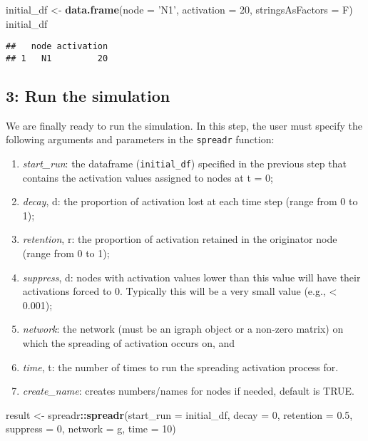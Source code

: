 \documentclass[]{article}
\newenvironment{Shaded}{\begin{snugshade}}{\end{snugshade}}
\newcommand{\KeywordTok}[1]{\textcolor[rgb]{0.13,0.29,0.53}{\textbf{#1}}}
\newcommand{\DataTypeTok}[1]{\textcolor[rgb]{0.13,0.29,0.53}{#1}}
\newcommand{\DecValTok}[1]{\textcolor[rgb]{0.00,0.00,0.81}{#1}}
\newcommand{\FloatTok}[1]{\textcolor[rgb]{0.00,0.00,0.81}{#1}}
\newcommand{\StringTok}[1]{\textcolor[rgb]{0.31,0.60,0.02}{#1}}
\newcommand{\OperatorTok}[1]{\textcolor[rgb]{0.81,0.36,0.00}{\textbf{#1}}}
\newcommand{\NormalTok}[1]{#1}
\providecommand{\tightlist}{%
  \setlength{\itemsep}{0pt}\setlength{\parskip}{0pt}}
\begin{document}
\begin{Shaded}
\begin{Highlighting}[]
\NormalTok{initial_df <-}\StringTok{ }\KeywordTok{data.frame}\NormalTok{(}\DataTypeTok{node =} \StringTok{'N1'}\NormalTok{, }\DataTypeTok{activation =} \DecValTok{20}\NormalTok{, }\DataTypeTok{stringsAsFactors =}\NormalTok{ F)}
\NormalTok{initial_df}
\end{Highlighting}
\end{Shaded}

\begin{verbatim}
##   node activation
## 1   N1         20
\end{verbatim}

\subsection{3: Run the simulation}\label{run-the-simulation}

We are finally ready to run the simulation. In this step, the user must
specify the following arguments and parameters in the \texttt{spreadr}
function:

\begin{enumerate}
\def\labelenumi{(\roman{enumi})}
\tightlist
\item
  \emph{start\_run}: the dataframe (\texttt{initial\_df}) specified in
  the previous step that contains the activation values assigned to
  nodes at t = 0;
\item
  \emph{decay}, d: the proportion of activation lost at each time step
  (range from 0 to 1);
\item
  \emph{retention}, r: the proportion of activation retained in the
  originator node (range from 0 to 1);
\item
  \emph{suppress}, d: nodes with activation values lower than this value
  will have their activations forced to 0. Typically this will be a very
  small value (e.g., \textless{} 0.001);
\item
  \emph{network}: the network (must be an igraph object or a non-zero
  matrix) on which the spreading of activation occurs on, and
\item
  \emph{time}, t: the number of times to run the spreading activation
  process for.\\
\item
  \emph{create\_name}: creates numbers/names for nodes if needed,
  default is TRUE.
\end{enumerate}

\begin{Shaded}
\begin{Highlighting}[]
\NormalTok{result <-}\StringTok{ }\NormalTok{spreadr}\OperatorTok{::}\KeywordTok{spreadr}\NormalTok{(}\DataTypeTok{start_run =}\NormalTok{ initial_df, }\DataTypeTok{decay =} \DecValTok{0}\NormalTok{,}
                              \DataTypeTok{retention =} \FloatTok{0.5}\NormalTok{, }\DataTypeTok{suppress =} \DecValTok{0}\NormalTok{,}
                              \DataTypeTok{network =}\NormalTok{ g, }\DataTypeTok{time =} \DecValTok{10}\NormalTok{) }
\end{Highlighting}
\end{Shaded}
\end{document}
